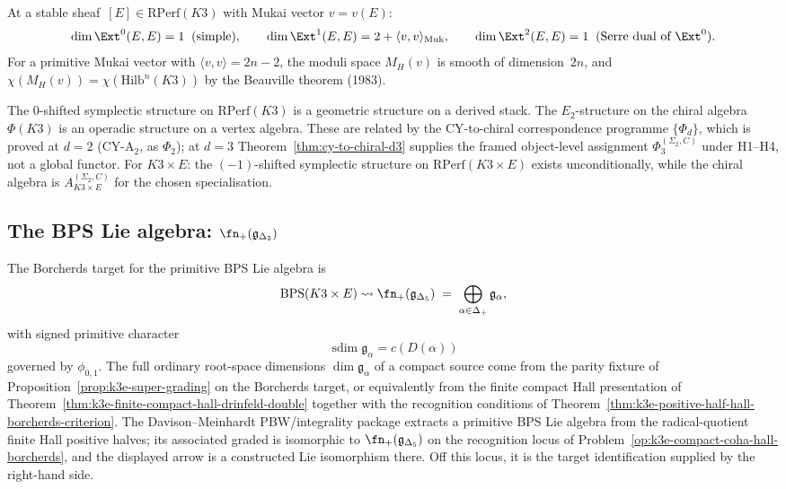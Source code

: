 \begin{remark}
\label{rem:k3e-tangent-rperf}
At a stable sheaf~$[E] \in \mathrm{RPerf}(K3)$ with Mukai vector $v = v(E)$:
\[
 \dim \Ext^0(E,E) = 1 \;\;(\text{simple}),\qquad
 \dim \Ext^1(E,E) = 2 + \langle v, v \rangle_{\mathrm{Muk}},\qquad
 \dim \Ext^2(E,E) = 1 \;\;(\text{Serre dual of }\Ext^0).
\]
For a primitive Mukai vector with $\langle v, v \rangle = 2n-2$, the moduli space $M_H(v)$ is smooth of dimension~$2n$, and $\chi(M_H(v)) = \chi(\mathrm{Hilb}^n(K3))$ by the Beauville theorem (1983).
\end{remark}

\begin{remark}
\label{rem:k3e-rperf-vs-chiral}
The $0$-shifted symplectic structure on $\mathrm{RPerf}(K3)$ is a geometric structure on a derived stack. The $E_2$-structure on the chiral algebra $\Phi(K3)$ is an operadic structure on a vertex algebra. These are related by the CY-to-chiral correspondence programme $\{\Phi_d\}$, which is proved at $d=2$ (CY-A$_2$, as $\Phi_2$); at $d=3$ Theorem~\ref{thm:cy-to-chiral-d3} supplies the framed object-level assignment $\Phi_3^{(\Sigma_2,C)}$ under H1--H4, not a global functor. For $K3 \times E$: the $(-1)$-shifted symplectic structure on $\mathrm{RPerf}(K3 \times E)$ exists unconditionally, while the chiral algebra is $A_{K3 \times E}^{(\Sigma_2,C)}$ for the chosen specialisation.
\end{remark}

\subsection{The BPS Lie algebra: \texorpdfstring{$\fn_+(\mathfrak{g}_{\Delta_5})$}{n-+(g-Delta-5)}}
\label{subsec:k3e-bps-lie-algebra}

\begin{theorem}
\label{thm:k3e-bps-lie}
The Borcherds target for the primitive BPS Lie algebra is
\[
 \mathrm{BPS}(K3 \times E)
 \rightsquigarrow
 \fn_+(\mathfrak{g}_{\Delta_5})
 \;=\;
 \bigoplus_{\alpha \in \Delta_+} \mathfrak{g}_\alpha,
\]
with signed primitive character
\[
\operatorname{sdim}\mathfrak g_\alpha=c(D(\alpha))
\]
governed by $\phi_{0,1}$. The full ordinary root-space dimensions
$\dim \mathfrak g_\alpha$ of a compact source come from the parity
fixture of Proposition~\ref{prop:k3e-super-grading} on the Borcherds
target, or equivalently from the finite compact Hall presentation of
Theorem~\ref{thm:k3e-finite-compact-hall-drinfeld-double} together with
the recognition conditions of
Theorem~\ref{thm:k3e-positive-half-hall-borcherds-criterion}. The
Davison--Meinhardt PBW/integrality package extracts a primitive BPS
Lie algebra from the radical-quotient finite Hall positive halves; its
associated graded is isomorphic to \(\fn_+(\mathfrak g_{\Delta_5})\)
on the recognition locus of
Problem~\ref{op:k3e-compact-coha-hall-borcherds}, and the displayed
arrow is a constructed Lie isomorphism there. Off this locus, it is
the target identification supplied by the right-hand side.
\end{theorem}

